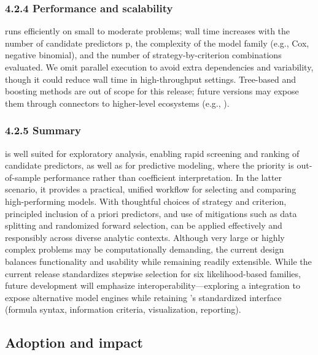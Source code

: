 \subsubsection{4.2.4 Performance and scalability}\label{performance-and-scalability}

 runs efficiently on small to moderate problems; wall time increases with the number of candidate predictors p, the complexity of the model family (e.g., Cox, negative binomial), and the number of strategy-by-criterion combinations evaluated. We omit parallel execution to avoid extra dependencies and variability, though it could reduce wall time in high-throughput settings. Tree-based and boosting methods are out of scope for this release; future versions may expose them through connectors to higher-level ecosystems (e.g., ).

\subsubsection{4.2.5 Summary}\label{summary}

 is well suited for exploratory analysis, enabling rapid screening and ranking of candidate predictors, as well as for predictive modeling, where the priority is out-of-sample performance rather than coefficient interpretation. In the latter scenario, it provides a practical, unified workflow for selecting and comparing high-performing models. With thoughtful choices of strategy and criterion, principled inclusion of a priori predictors, and use of mitigations such as data splitting and randomized forward selection,  can be applied effectively and responsibly across diverse analytic contexts. Although very large or highly complex problems may be computationally demanding, the current design balances functionality and usability while remaining readily extensible. While the current release standardizes stepwise selection for six likelihood-based families, future development will emphasize interoperability---exploring a  integration to expose alternative model engines while retaining 's standardized interface (formula syntax, information criteria, visualization, reporting).

\subsection{Adoption and impact}\label{adoption-and-impact}

